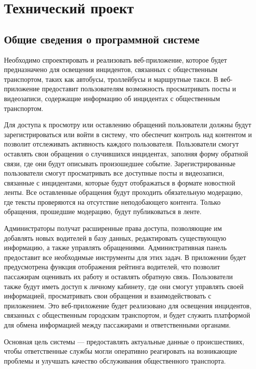 \section{Технический проект}
\subsection{Общие сведения о программной системе}

Необходимо спроектировать и реализовать веб-приложение, которое будет предназначено для освещения инцидентов, связанных с общественным транспортом, таких как автобусы, троллейбусы и маршрутные такси. В веб-приложение предоставит пользователям возможность просматривать посты и видеозаписи, содержащие информацию об инцидентах с общественным транспортом. 

Для доступа к просмотру или оставлению обращений пользователи должны будут зарегистрироваться или войти в систему, что обеспечит контроль над контентом и позволит отслеживать активность каждого пользователя. Пользователи смогут оставлять свои обращения о случившихся инцидентах, заполняя форму обратной связи, где они будут описывать произошедшее событие. Зарегистрированные пользователи смогут просматривать все доступные посты и видеозаписи, связанные с инцидентами, которые будут отображаться в формате новостной ленты. Все оставленные обращения будут проходить обязательную модерацию, где тексты проверяются на отсутствие неподобающего контента. Только обращения, прошедшие модерацию, будут публиковаться в ленте.

Администраторы получат расширенные права доступа, позволяющие им добавлять новых водителей в базу данных, редактировать существующую информацию, а также управлять обращениями. Административная панель предоставит все необходимые инструменты для этих задач. В приложении будет предусмотрена функция отображения рейтинга водителей, что позволит пассажирам оценивать их работу и оставлять обратную связь. Пользователи также будут иметь доступ к личному кабинету, где они смогут управлять своей информацией, просматривать свои обращения и взаимодействовать с приложением. Это веб-приложение будет реализовано для освещения инцидентов, связанных с общественным городским транспортом, и будет служить платформой для обмена информацией между пассажирами и ответственными органами. 

Основная цель системы — предоставлять актуальные данные о происшествиях, чтобы ответственные службы могли оперативно реагировать на возникающие проблемы и улучшать качество обслуживания общественного транспорта.

